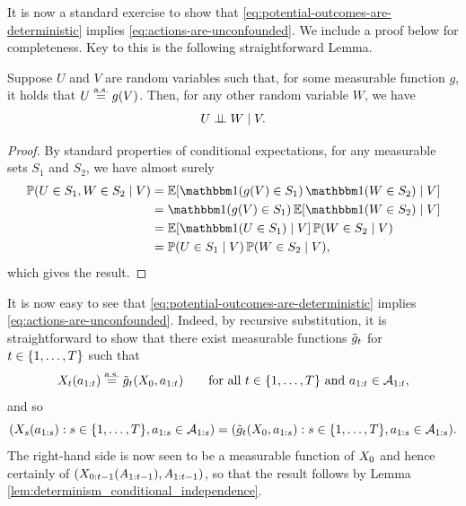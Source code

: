 It is now a standard exercise to show that \eqref{eq:potential-outcomes-are-deterministic} implies \eqref{eq:actions-are-unconfounded}.
We include a proof below for completeness.
Key to this is the following straightforward Lemma.

\begin{lemma}\label{lem:determinism_conditional_independence}
Suppose $U$ and $V$ are random variables such that, for some measurable function $g$, it holds that $U \overset{\mathrm{a.s.}}{=} g(V)$.
Then, for any other random variable $W$, we have
\[
    U \perp\!\!\!\perp W \mid V.
\]
\end{lemma}

\begin{proof}
By standard properties of conditional expectations, for any measurable sets $S_1$ and $S_2$, we have almost surely
\begin{align*}
    \Prob(U \in S_1, W \in S_2 \mid V) &= \E[\ind(g(V) \in S_1) \, \ind(W \in S_2) \mid V] \\
    &= \ind(g(V) \in S_1) \, \E[\ind(W \in S_2) \mid V] \\
    &= \E[\ind(U \in S_1) \mid V] \, \Prob(W \in S_2 \mid V) \\
    &= \Prob(U \in S_1 \mid V) \, \Prob(W \in S_2 \mid V),
\end{align*}
which gives the result.
\end{proof}

It is now easy to see that \eqref{eq:potential-outcomes-are-deterministic} implies \eqref{eq:actions-are-unconfounded}.
Indeed, by recursive substitution, it is straightforward to show that there exist measurable functions $\tilde{g}_t$ for $t \in \{1, \ldots, T\}$ such that
\[
    X_t(a_{1:t}) \overset{\mathrm{a.s.}}{=} \tilde{g}_t(X_{0}, a_{1:t}) \qquad \text{for all $t \in \{1, \ldots, T\}$ and $a_{1:t} \in \mathcal{A}_{1:t}$},
\]
and so
\[
    (X_{s}(a_{1:s}) : s \in \{1, \ldots, T\}, a_{1:s} \in \mathcal{A}_{1:s})
        = (\tilde{g}_t(X_{0}, a_{1:s}) : s \in \{1, \ldots, T\}, a_{1:s} \in \mathcal{A}_{1:s}).
\]
The right-hand side is now seen to be a measurable function of $X_0$ and hence certainly of $(X_{0:t-1}(A_{1:t-1}), A_{1:t-1})$, so that the result follows by Lemma \ref{lem:determinism_conditional_independence}.


